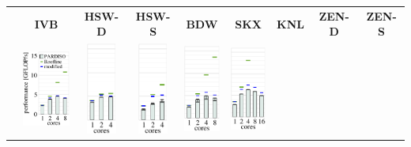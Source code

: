 
 \begin{tabular}{lcccccccc}
 &
 \multicolumn{1}{c}{\tiny \bfseries IVB} & \multicolumn{1}{c}{\tiny \bfseries
HSW-D} & \multicolumn{1}{c}{\tiny \bfseries HSW-S} & \multicolumn{1}{c}{\tiny
\bfseries BDW} & \multicolumn{1}{c}{\tiny \bfseries SKX} &
\multicolumn{1}{c}{\tiny \bfseries KNL} & \multicolumn{1}{c}{\tiny \bfseries
ZEN-D} & \multicolumn{1}{c}{\tiny \bfseries ZEN-S} \\

 \raisebox{1.70cm}{\rotatebox[origin=c]{90}{lapl1}} &
  \includegraphics[height=3.0cm,clip=true]{images/perf/p-80/p-emmy-n-40-b-4}%
  & 
  \includegraphics[height=3.0cm,clip=true]{images/perf/p-80/p-woody-hsw-n-40-b-4}%
  & 
  \includegraphics[height=3.0cm,clip=true]{images/perf/p-80/p-hasep1-n-40-b-4}%
  & 
  \includegraphics[height=3.0cm,clip=true]{images/perf/p-80/p-meggie-n-40-b-4}%
  & 
  \includegraphics[height=3.0cm,clip=true]{images/perf/p-80/p-skylakesp2-n-40-b-4}%

\end{tabular}

